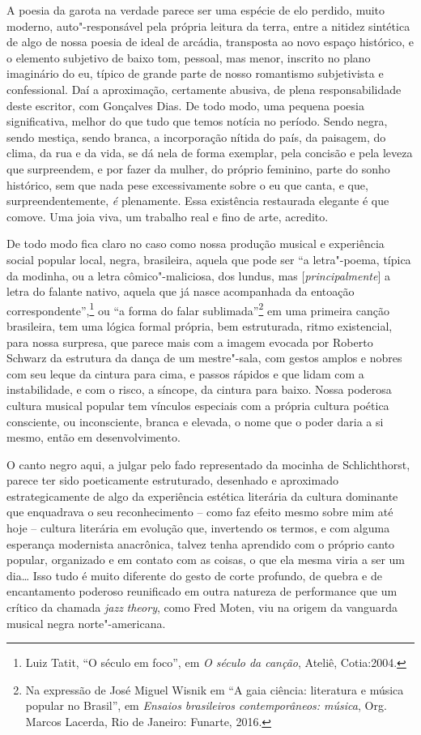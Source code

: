 A poesia da garota na verdade parece ser uma espécie de elo perdido,
muito moderno, auto"-responsável pela própria leitura da terra, entre a
nitidez sintética de algo de nossa poesia de ideal de arcádia,
transposta ao novo espaço histórico, e o elemento subjetivo de baixo
tom, pessoal, mas menor, inscrito no plano imaginário do eu, típico de
grande parte de nosso romantismo subjetivista e confessional. Daí a
aproximação, certamente abusiva, de plena responsabilidade deste
escritor, com Gonçalves Dias. De todo modo, uma pequena poesia
significativa, melhor do que tudo que temos notícia no período. Sendo
negra, sendo mestiça, sendo branca, a incorporação nítida do país, da
paisagem, do clima, da rua e da vida, se dá nela de forma exemplar, pela
concisão e pela leveza que surpreendem, e por fazer da mulher, do
próprio feminino, parte do sonho histórico, sem que nada pese
excessivamente sobre o eu que canta, e que, surpreendentemente, \emph{é}
plenamente. Essa existência restaurada elegante é que comove. Uma joia
viva, um trabalho real e fino de arte, acredito.

De todo modo fica claro no caso como nossa produção musical e
experiência social popular local, negra, brasileira, aquela que pode ser
``a letra"-poema, típica da modinha, ou a letra cômico"-maliciosa, dos
lundus, mas {[}\emph{principalmente}{]} a letra do falante nativo,
aquela que já nasce acompanhada da entoação correspondente'',\footnote{Luiz
  Tatit, ``O século  em foco'', em \emph{O século da canção}, Ateliê,
  Cotia:2004.} ou ``a forma do falar sublimada''\footnote{Na expressão
  de José Miguel Wisnik em ``A gaia ciência: literatura e música popular
  no Brasil'', em \emph{Ensaios brasileiros contemporâneos: música},
  Org. Marcos Lacerda, Rio de Janeiro: Funarte, 2016.} em uma primeira
canção brasileira, tem uma lógica formal própria, bem
estruturada, ritmo existencial, para nossa surpresa, que parece mais com
a imagem evocada por Roberto Schwarz da estrutura da dança de um
mestre"-sala, com gestos amplos e nobres com seu leque da cintura para
cima, e passos rápidos e que lidam com a instabilidade, e com o risco, a
síncope, da cintura para baixo. Nossa poderosa cultura musical popular
tem vínculos especiais com a própria cultura poética consciente, ou
inconsciente, branca e elevada, o nome que o poder daria a si mesmo,
então em desenvolvimento.

O canto negro aqui, a julgar pelo fado representado da mocinha de
Schlichthorst, parece ter sido poeticamente estruturado, desenhado e
aproximado estrategicamente de algo da experiência estética literária da
cultura dominante que enquadrava o seu reconhecimento -- como faz efeito
mesmo sobre mim até hoje -- cultura literária em evolução que,
invertendo os termos, e com alguma esperança modernista anacrônica,
talvez tenha aprendido com o próprio canto popular, organizado e em
contato com as coisas, o que ela mesma viria a ser um dia\ldots{} Isso tudo é
muito diferente do gesto de corte profundo, de quebra e de encantamento
poderoso reunificado em outra natureza de performance que um crítico da
chamada \emph{jazz} \emph{theory}, como Fred Moten, viu na origem da
vanguarda musical negra norte"-americana.

